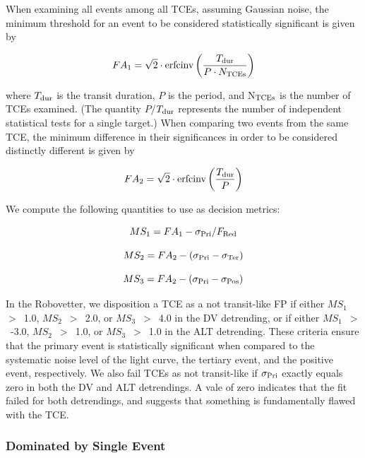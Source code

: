 When examining all events among all TCEs, assuming Gaussian noise, the minimum threshold for an event to be considered statistically significant is given by

\begin{equation}
    FA_{1} = \sqrt{2}\cdot \textrm{erfcinv}\left(\frac{T_{\rm dur}}{P \cdot N_{\rm TCEs}}\right)
\end{equation}

\noindent where $T_{\rm dur}$ is the transit duration, $P$ is the period, and N$_{\rm TCEs}$ is the number of TCEs examined. (The quantity $P$/$T_{\rm dur}$ represents the number of independent statistical tests for a single target.) When comparing two events from the same TCE, the minimum difference in their significances in order to be considered distinctly different is given by

\begin{equation}
    FA_{2} = \sqrt{2}\cdot \textrm{erfcinv}\left(\frac{T_{\rm dur}}{P}\right)
\end{equation}

\noindent We compute the following quantities to use as decision metrics:

\begin{equation}
    MS_{1} = FA_{1} - \sigma_{\rm Pri}/F_{\rm Red}
\end{equation}

\begin{equation}
    MS_{2} = FA_{2} - (\sigma_{\rm Pri} - \sigma_{\rm Ter})
\end{equation}

\begin{equation}
    MS_{3} = FA_{2} - (\sigma_{\rm Pri} - \sigma_{\rm Pos})
\end{equation}

In the Robovetter, we disposition a TCE as a not transit-like FP if either $MS_{1}$~$>$~1.0, $MS_{2}$~$>$~2.0, or $MS_{3}$~$>$~4.0 in the DV detrending, or if either $MS_{1}$~$>$~-3.0, $MS_{2}$~$>$~1.0, or $MS_{3}$~$>$~1.0 in the ALT detrending. These criteria ensure that the primary event is statistically significant when compared to the systematic noise level of the light curve, the tertiary event, and the positive event, respectively. We also fail TCEs as not transit-like if $\sigma_{\rm Pri}$ exactly equals zero in both the DV and ALT detrendings. A vale of zero indicates that the fit failed for both detrendings, and suggests that something is fundamentally flawed with the TCE.


\subsubsection{Dominated by Single Event}
\label{s:sesmes}

